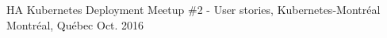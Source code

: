 

\begin{cvhonors}

  \cvhonor
    {HA Kubernetes Deployment} %
    {Meetup \#2 - User stories, Kubernetes-Montréal} %
    {Montréal, Québec} %
    {Oct. 2016} %

\end{cvhonors}